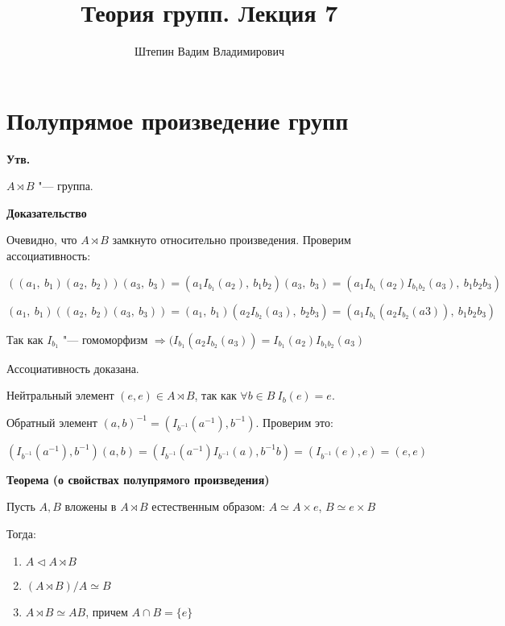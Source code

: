 \documentclass{article}
\title{Теория групп. Лекция 7}
\author{Штепин Вадим Владимирович}
\date{\DTMdate{2019-10-17}}
\begin{document}
\maketitle

\section{Полупрямое произведение групп}

\textbf{Утв.}

$A \rtimes B$ "--- группа.

\textbf{Доказательство}

Очевидно, что $A \rtimes B$ замкнуто относительно произведения. Проверим ассоциативность: 

$((a_1, \  b_1)(a_2, \  b_2))(a_3, \  b_3) = (a_1I_{b_1}(a_2),  \  b_1b_2)(a_3,  \  b_3) = (a_1I_{b_1}(a_2)I_{b_1b_2}(a_3), \  b_1b_2b_3)$

$(a_1,  \  b_1)((a_2, \  b_2)(a_3, \  b_3)) = (a_1, \  b_1)(a_2I_{b_2}(a_3), \  b_2b_3) = (a_1I_{b_1}(a_2I_{b_2}(a3)), \  b_1b_2b_3)$

Так как $I_{b_1}$ "--- гомоморфизм $\Rightarrow (I_{b_1}(a_2I_{b_2}(a_3)) = I_{b_1}(a_2)I_{b_1b_2}(a_3)$

Ассоциативность доказана.

Нейтральный элемент $(e, e) \in A \rtimes B$, так как $\forall b \in B \  I_b(e) = e$.

Обратный элемент $(a, b)^{-1} = (I_{b^{-1}}(a^{-1}), b^{-1})$. Проверим это:

$(I_{b^{-1}}(a^{-1}), b^{-1})(a, b) = (I_{b^{-1}}(a^{-1})I_{b^{-1}}(a), b^{-1}b) = (I_{b^{-1}}(e), e) = (e, e)$

\vspace{10pt}

\textbf{Теорема (о свойствах полупрямого произведения)}

Пусть $A, B$ вложены в $A \rtimes B$ естественным образом: $A \simeq A \times e$, $B \simeq e \times B$

Тогда:

\begin{enumerate}
	\item $A \triangleleft A \rtimes B$
	\item $(A \rtimes B) / A \simeq B$
	\item $A \rtimes B \simeq AB$, причем $A \cap B = \{e\}$
\end{enumerate}

\vspace{5pt}
\end{document}
